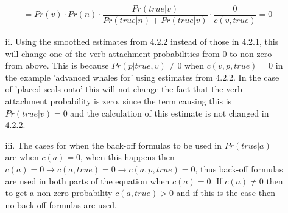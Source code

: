\documentclass{article}
\begin{document}
\begin{enumerate}
\begin{enumerate}
\begin{align*}
&=Pr(v) \cdot Pr(n) \cdot \dfrac{Pr(true|v)}{Pr(true|n) + Pr(true|v)} \cdot \dfrac{0}{c(v,true)}=0
\end{align*}
\item[ii.] Using the smoothed estimates from 4.2.2 instead of those in 4.2.1, this will change one of the verb attachment probabilities from 0 to non-zero from above. This is because $Pr(p|true,v) \ne 0$ when $c(v,p,true)=0$ in the example 'advanced whales for' using estimates from 4.2.2. In the case of 'placed seals onto' this will not change the fact that the verb attachment probability is zero, since the term causing this is $Pr(true|v)=0$ and the calculation of this estimate is not changed in 4.2.2.
\item[iii.] The cases for when the back-off formulas to be used in $Pr(true|a)$ are when $c(a)=0$, when this happens then $c(a)=0 \rightarrow c(a,true)=0 \rightarrow c(a,p,true)=0$, thus back-off formulas are used in both parts of the equation when $c(a)=0$. If $c(a)\ne 0$ then to get a non-zero probability $c(a,true)>0$ and if this is the case then no back-off formulas are used.
\end{enumerate}
\end{enumerate}
\end{document}

